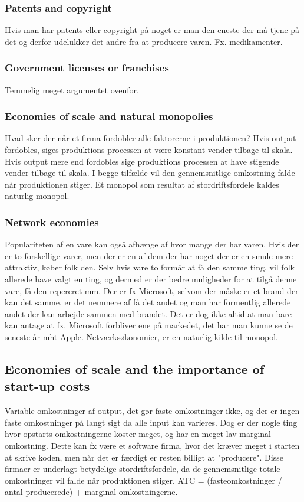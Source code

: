 \subsubsection{Patents and copyright}
Hvis man har patents eller copyright på noget er man den eneste der må tjene på det og derfor udelukker det andre fra at producere varen. Fx. medikamenter. 
\subsubsection{Government licenses or franchises}
Temmelig meget argumentet ovenfor.

\subsubsection{Economies of scale and natural monopolies}
Hvad sker der når et firma fordobler alle faktorerne i produktionen? Hvis output fordobles, siges produktions processen at være konstant vender tilbage til skala. Hvis output mere end fordobles sige produktions processen at have stigende vender tilbage til skala. I begge tilfælde vil den gennemsnitlige omkostning falde når produktionen stiger. Et monopol som resultat af stordriftsfordele kaldes naturlig monopol.

\subsubsection{Network economies}
Populariteten af en vare kan også afhænge af hvor mange der har varen. Hvis der er to forskellige varer, men der er en af dem der har noget der er en smule mere attraktiv, køber folk den. Selv hvis vare to formår at få den samme ting, vil folk allerede have valgt en ting, og dermed er der bedre muligheder for at tilgå denne vare, få den repereret mm. Der er fx Microsoft, selvom der måske er et brand der kan det samme, er det nemmere af få det andet og man har formentlig allerede andet der kan arbejde sammen med brandet. Det er dog ikke altid at man bare kan antage at fx. Microsoft forbliver ene på markedet, det har man kunne se de seneste år mht Apple. Netværksøkonomier, er en naturlig kilde til monopol. 

\subsection{Economies of scale and the importance of start-up costs}
Variable omkostninger af output, det gør faste omkostninger ikke, og der er ingen faste omkostninger på langt sigt da alle input kan varieres. Dog er der nogle ting hvor opstarts omkostningerne koster meget, og har en meget lav marginal omkostning. Dette kan fx være et software firma, hvor det kræver meget i starten at skrive koden, men når det er færdigt er resten billigt at "producere". Disse firmaer er underlagt betydelige stordriftsfordele, da de gennemsnitlige totale omkostninger vil falde når produktionen stiger, ATC = (fasteomkostninger / antal producerede) + marginal omkostningerne.

